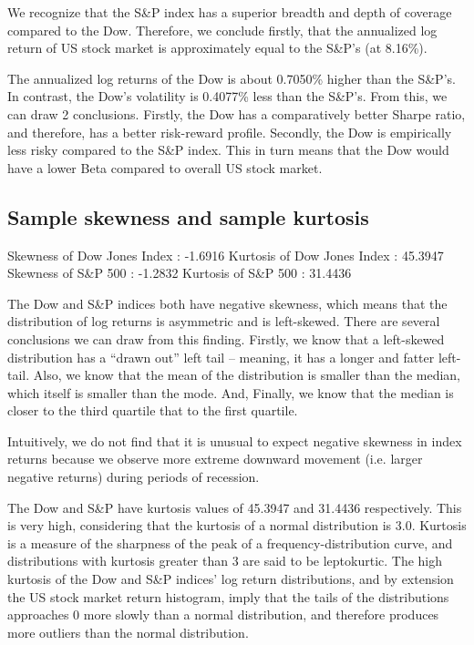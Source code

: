 \documentclass[a4paper]{article}
\begin{document}
	We recognize that the S\&P index has a superior breadth and depth of coverage compared to the Dow. Therefore, we conclude firstly, that the annualized log return of US stock market is approximately equal to the S\&P’s (at 8.16\%).
	
	The annualized log returns of the Dow is about 0.7050\% higher than the S\&P’s. In contrast, the Dow’s volatility is 0.4077\% less than the S\&P’s. From this, we can draw 2 conclusions. Firstly, the Dow has a comparatively better Sharpe ratio, and therefore, has a better risk-reward profile. Secondly, the Dow is empirically less risky compared to the S\&P index. This in turn means that the Dow would have a lower Beta compared to overall US stock market.
	
	
	\subsection{Sample skewness and sample kurtosis}
	\begin{flushleft}
		Skewness of Dow Jones Index : -1.6916 \linebreak
		Kurtosis of Dow Jones Index : 45.3947 \linebreak
		Skewness of S\&P 500 : -1.2832 \linebreak
		Kurtosis of S\&P 500 : 31.4436 \linebreak
	\end{flushleft}
	\vspace{-7mm}
	The Dow and S\&P indices both have negative skewness, which means that the distribution of log returns is asymmetric and is left-skewed. There are several conclusions we can draw from this finding. Firstly, we know that a left-skewed distribution has a “drawn out” left tail – meaning, it has a longer and fatter left-tail. Also, we know that the mean of the distribution is smaller than the median, which itself is smaller than the mode. And, Finally, we know that the median is closer to the third quartile that to the first quartile. 
	
	Intuitively, we do not find that it is unusual to expect negative skewness in index returns because we observe more extreme downward movement (i.e. larger negative returns) during periods of recession.
	
	The Dow and S\&P have kurtosis values of 45.3947 and 31.4436 respectively. This is very high, considering that the kurtosis of a normal distribution is 3.0. Kurtosis is a measure of the sharpness of the peak of a frequency-distribution curve, and distributions with kurtosis greater than 3 are said to be leptokurtic. The high kurtosis of the Dow and S\&P indices' log return distributions, and by extension the US stock market return histogram, imply that the tails of the distributions approaches 0 more slowly than a normal distribution, and therefore produces more outliers than the normal distribution. 
	
\end{document}
